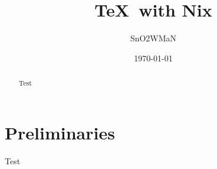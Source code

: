 \documentclass[11pt]{amsart}
\title{\TeX~with Nix}
\author{SnO2WMaN}
\date{\today}
\begin{document}
\begin{abstract}
	Test
\end{abstract}

\maketitle

\setcounter{tocdepth}{3}
\tableofcontents

\section{Preliminaries}

\begin{definition}
	Test
\end{definition}
\end{document}
